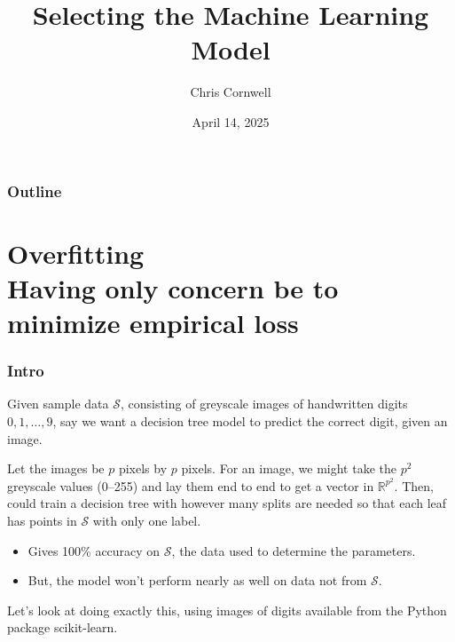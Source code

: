 \documentclass[smaller]{beamer}
\author{Chris Cornwell}
\date{April 14, 2025}
\title{Selecting the Machine Learning Model}
\theoremstyle{example}
\begin{document}
\begin{frame}
\titlepage
\end{frame}

\begin{frame}
    \frametitle{Outline}
    \tableofcontents
\end{frame}

\section{Overfitting \\ Having only concern be to minimize empirical loss}

\begin{frame}
\frametitle{Intro}
Given sample data $\mathcal S$, consisting of greyscale images of handwritten digits $0,1,\ldots,9$, say we want a decision tree model to predict the correct digit, given an image. 

Let the images be $p$ pixels by $p$ pixels. For an image, we might take the $p^2$ greyscale values (0{--}255) and lay them end to end to get a vector in $\mathbb R^{p^2}$. Then, could train a decision tree with however many splits are needed so that each leaf has points in $\mathcal S$ with only one label. 
\begin{itemize}
    \item Gives 100\% accuracy on $\mathcal S$, the data used to determine the parameters.
    \item But, the model won't perform nearly as well on data not from $\mathcal S$. 
\end{itemize}

Let's look at doing exactly this, using images of digits available from the Python package scikit-learn. 
\end{frame}
\end{document}
